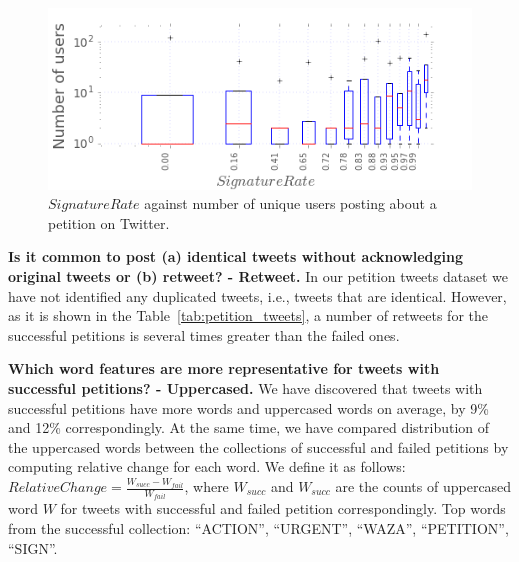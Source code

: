 \begin{figure}
\centering
\includegraphics[scale=0.43]{figures/signaturesgoalVSnumusersCampaigns.png}
\caption{$SignatureRate$ against number of unique users posting about a petition on Twitter.}
\label{fig:signatures_vs_users}
\end{figure}

\textbf{Is it common to post (a) identical tweets without acknowledging original tweets or (b) retweet? - Retweet.} In our petition tweets dataset we have not identified any duplicated tweets, i.e., tweets that are identical. However, as it is shown in the Table~\ref{tab:petition_tweets}, a number of retweets for the successful petitions is several times greater than the failed ones.

\textbf{Which word features are more representative for tweets with successful petitions? - Uppercased.} We have discovered that tweets with successful petitions have more words and uppercased words on average, by 9\% and 12\% correspondingly. At the same time, we have compared distribution of the uppercased words between the collections of successful and failed petitions by computing relative change for each word. We define it as follows: $RelativeChange = \frac{W_{succ} - W_{fail}}{W_{fail}}$, where $W_{succ}$ and $W_{succ}$ are the counts of uppercased word $W$ for tweets with successful and failed petition correspondingly. Top words from the successful collection: ``ACTION'', ``URGENT'', ``WAZA'', ``PETITION'', ``SIGN''.